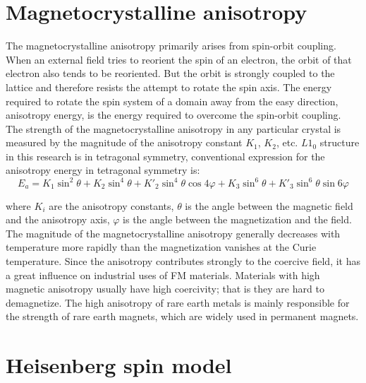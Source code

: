 \section{Magnetocrystalline anisotropy}
The magnetocrystalline anisotropy primarily arises from spin-orbit coupling.
When an external field tries to reorient the spin of an electron, the orbit of that electron
also tends to be reoriented. But the orbit is strongly coupled to the lattice and therefore
resists the attempt to rotate the spin axis. The energy required to rotate the spin system of
a domain away from the easy direction, anisotropy energy, is the energy required to
overcome the spin-orbit coupling. The strength of the magnetocrystalline anisotropy in
any particular crystal is measured by the magnitude of the anisotropy constant $K_1$, $K_2$, etc.
$L1_0$ structure in this research is in tetragonal symmetry, conventional expression for the
anisotropy energy in tetragonal symmetry is:
\begin{equation}
E_a = K_1 \sin^2 \theta + K_2 \sin^4 \theta + K'_2 \sin^4  \theta \cos 4\varphi + K_3 \sin^6 \theta +K'_3 \sin^6 \theta \sin 6 \varphi
\end{equation}

where $K_i$ are the anisotropy constants, $\theta$
is the angle between the magnetic field and the anisotropy axis, $\varphi$ is the angle between
the magnetization and the field.
The magnitude of the magnetocrystalline anisotropy generally decreases with
temperature more rapidly than the magnetization vanishes at the Curie temperature. Since
the anisotropy contributes strongly to the coercive field, it has a great influence on
industrial uses of FM materials. Materials with high magnetic anisotropy
usually have high coercivity; that is they are hard to demagnetize.
The high anisotropy of rare earth metals is mainly responsible for the strength of rare earth magnets, which are widely used in permanent magnets.

\section{Heisenberg spin model}
\label{section: Heisenberg spin model}

